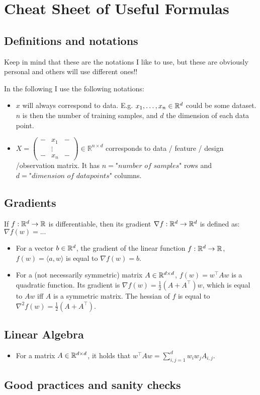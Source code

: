 \section{Cheat Sheet of Useful Formulas}

\subsection{Definitions and notations}

Keep in mind that these are the notations I like to use, but these are obviously personal and others will use different ones!!

In the following I use the following notations:
\begin{itemize}
    \item $x$ will always correspond to data. E.g. $x_1, \dots, x_n \in \mathbb{R}^d$ could be some dataset. $n$ is then the number of training samples, and $d$ the dimension of each data point.
    \item $X = \begin{pmatrix}
- & x_1 & - \\
  & \vdots &  \\
- & x_n & -
\end{pmatrix}
\in \mathbb{R}^{n \times d}$ corresponds to data / feature / design /observation matrix. It has $n = \textit{"number \ of \ samples"}$ rows and $d = \textit{"dimension \ of \ datapoints"}$ columns.
\end{itemize}

\subsection{Gradients}

If $f : \mathbb{R}^d \to \mathbb{R}$ is differentiable, then its gradient $\nabla f : \mathbb{R}^d \to \mathbb{R}^d$ is defined as: $\nabla f(w) = ... $

\begin{itemize}
    \item For a vector $b \in \mathbb{R}^d$, the gradient of the linear function $f : \mathbb{R}^d \to \mathbb{R}$, $f(w) = \langle a , w \rangle $ is equal to $\nabla f(w) = b$. 
    \item For a (not necessarily symmetric) matrix $A \in \mathbb{R}^{d \times d}$, $f(w) = w^\top A w$ is a quadratic function. Its gradient is $\nabla f(w) = \frac{1}{2} (A + A^\top) w$, which is equal to $A w$ iff $A$ is a symmetric matrix. The hessian of $f$ is equal to $\nabla^2 f(w) = \frac{1}{2} (A + A^\top)$. 
\end{itemize}

\subsection{Linear Algebra}

\begin{itemize}
    \item For a matrix $A \in \mathbb{R}^{d \times d}$, it holds that $w^\top A w = \sum_{i, j = 1}^d w_i w_j A_{i, j}$. 
\end{itemize}


\subsection{Good practices and sanity checks}


